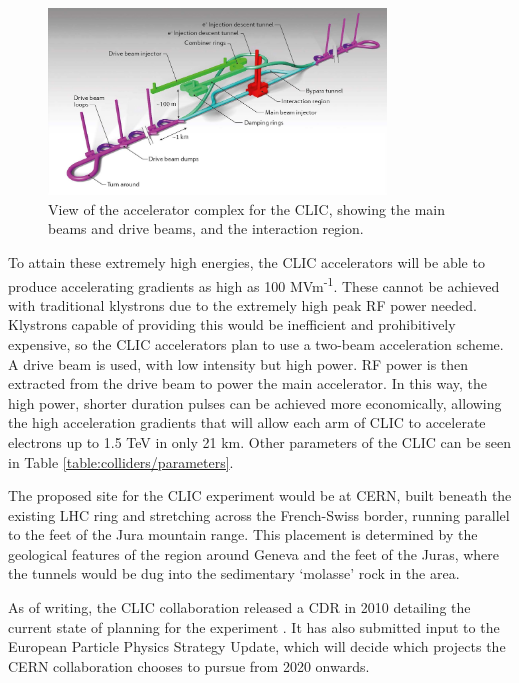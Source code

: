 \begin{figure}[h]
	\centering
	\includegraphics[width=0.8\textwidth]{../Pictures/CLIC-Render.jpg}
	\caption{View of the accelerator complex for the \acrlong{CLIC}, showing the main beams and drive beams, and the interaction region.}
	\label{figure:colliders/CLIC/main}
\end{figure}

To attain these extremely high energies, the \acrshort{CLIC} accelerators will be able to produce accelerating gradients as high as 100 MVm\textsuperscript{-1}. These cannot be achieved with traditional klystrons due to the extremely high peak \acrshort{RF} power needed. Klystrons capable of providing this would be inefficient and prohibitively expensive, so the \acrshort{CLIC} accelerators plan to use a two-beam acceleration scheme. A drive beam is used, with low intensity but high power. \acrshort{RF} power is then extracted from the drive beam to power the main accelerator. In this way, the high power, shorter duration pulses can be achieved more economically, allowing the high acceleration gradients that will allow each arm of \acrshort{CLIC} to accelerate electrons up to 1.5 TeV in only 21 km. Other parameters of the \acrshort{CLIC} can be seen in Table \ref{table:colliders/parameters}.

The proposed site for the \acrshort{CLIC} experiment would be at \acrshort{CERN}, built beneath the existing \acrshort{LHC} ring and stretching across the French-Swiss border, running parallel to the feet of the Jura mountain range. This placement is determined by the geological features of the region around Geneva and the feet of the Juras, where the tunnels would be dug into the sedimentary `molasse' rock in the area. 

As of writing, the \acrshort{CLIC} collaboration released a \acrfull{CDR} in 2010 detailing the current state of planning for the experiment \cite{clic-cdr-main}. It has also submitted input to the European Particle Physics Strategy Update, which will decide which projects the \acrshort{CERN} collaboration chooses to pursue from 2020 onwards.


